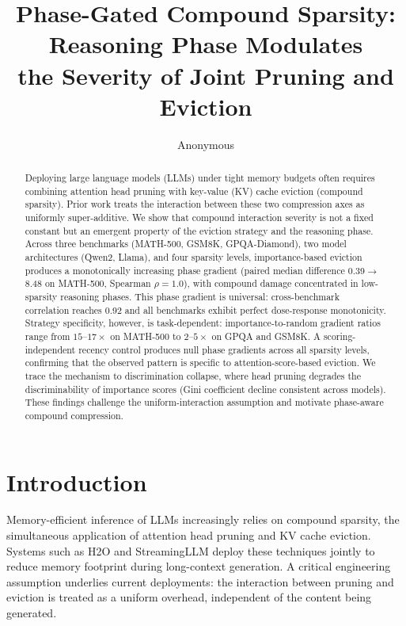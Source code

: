 \documentclass[11pt,a4paper]{article}
\title{Phase-Gated Compound Sparsity: Reasoning Phase Modulates\\the Severity of Joint Pruning and Eviction}
\author{Anonymous}
\date{}
\begin{document}
\maketitle

\begin{abstract}
Deploying large language models (LLMs) under tight memory budgets often requires combining attention head pruning with key-value (KV) cache eviction (compound sparsity). Prior work treats the interaction between these two compression axes as uniformly super-additive. We show that compound interaction severity is not a fixed constant but an emergent property of the eviction strategy and the reasoning phase. Across three benchmarks (MATH-500, GSM8K, GPQA-Diamond), two model architectures (Qwen2, Llama), and four sparsity levels, importance-based eviction produces a monotonically increasing phase gradient (paired median difference 0.39$\to$8.48 on MATH-500, Spearman $\rho{=}1.0$), with compound damage concentrated in low-sparsity reasoning phases. This phase gradient is universal: cross-benchmark correlation reaches 0.92 and all benchmarks exhibit perfect dose-response monotonicity. Strategy specificity, however, is task-dependent: importance-to-random gradient ratios range from $15$--$17\times$ on MATH-500 to $2$--$5\times$ on GPQA and GSM8K. A scoring-independent recency control produces null phase gradients across all sparsity levels, confirming that the observed pattern is specific to attention-score-based eviction. We trace the mechanism to discrimination collapse, where head pruning degrades the discriminability of importance scores (Gini coefficient decline consistent across models). These findings challenge the uniform-interaction assumption and motivate phase-aware compound compression.
\end{abstract}

\section{Introduction}

Memory-efficient inference of LLMs increasingly relies on compound sparsity, the simultaneous application of attention head pruning and KV cache eviction. Systems such as H2O \citep{zhang2024h2o} and StreamingLLM \citep{xiao2024efficient} deploy these techniques jointly to reduce memory footprint during long-context generation. A critical engineering assumption underlies current deployments: the interaction between pruning and eviction is treated as a uniform overhead, independent of the content being generated.
\end{document}
